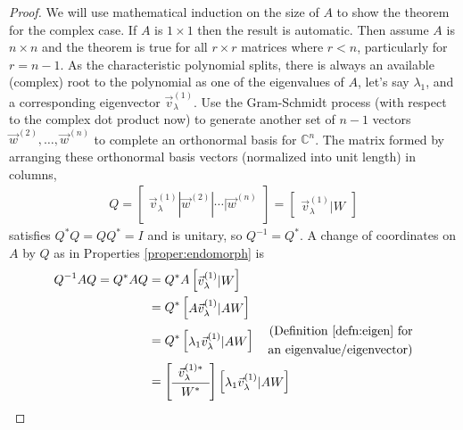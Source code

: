 \begin{proof}
We will use mathematical induction on the size of $A$ to show the theorem for the complex case. If $A$ is $1 \times 1$ then the result is automatic. Then assume $A$ is $n \times n$ and the theorem is true for all $r \times r$ matrices where $r < n$, particularly for $r = n-1$. As the characteristic polynomial splits, there is always an available (complex) root to the polynomial as one of the eigenvalues of $A$, let's say $\lambda_1$, and a corresponding eigenvector $\vec{v}_\lambda^{(1)}$. Use the Gram-Schmidt process (with respect to the complex dot product now) to generate another set of $n-1$ vectors $\vec{w}^{(2)}, \ldots, \vec{w}^{(n)}$ to complete an orthonormal basis for $\mathbb{C}^n$. The matrix formed by arranging these orthonormal basis vectors (normalized into unit length) in columns,
\begin{align*}
Q = \begin{bmatrix}
\vec{v}_\lambda^{(1)} | \vec{w}^{(2)} | \cdots | \vec{w}^{(n)}
\end{bmatrix} =
\begin{bmatrix}
\vec{v}_\lambda^{(1)} | W
\end{bmatrix}
\end{align*}
satisfies $Q^*Q = QQ^* = I$ and is unitary, so $Q^{-1} = Q^*$. A change of coordinates on $A$ by $Q$ as in Properties \ref{proper:endomorph} is
\begin{align*}
Q^{-1}AQ = Q^* AQ &= Q^*A\begin{bmatrix}
\vec{v}_\lambda^{(1)} | W
\end{bmatrix} \\
&= Q^*\begin{bmatrix}
A\vec{v}_\lambda^{(1)} | AW
\end{bmatrix} \\
&= Q^*\begin{bmatrix}
\lambda_1\vec{v}_\lambda^{(1)} | AW
\end{bmatrix} \quad \begin{aligned}
\text{(Definition \ref{defn:eigen} for} \\
\text{an eigenvalue/eigenvector)}
\end{aligned} \\
&= 
\left[\begin{array}{c}
\vec{v}_\lambda^{(1)*} \Bstrut \\
\hline
W^* \Tstrut
\end{array}\right]
\begin{bmatrix}
\lambda_1\vec{v}_\lambda^{(1)} | AW

\end{bmatrix}
\end{align*}
\end{proof}
